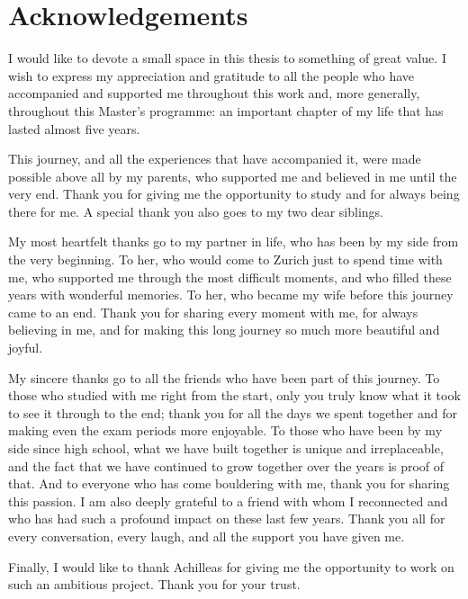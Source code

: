\chapter*{Acknowledgements}

I would like to devote a small space in this thesis to something of great value. I wish to express my appreciation and gratitude to all the people who have accompanied and supported me throughout this work and, more generally, throughout this Master's programme: an important chapter of my life that has lasted almost five years.

This journey, and all the experiences that have accompanied it, were made possible above all by my parents, who supported me and believed in me until the very end. Thank you for giving me the opportunity to study and for always being there for me. A special thank you also goes to my two dear siblings.

My most heartfelt thanks go to my partner in life, who has been by my side from the very beginning. To her, who would come to Zurich just to spend time with me, who supported me through the most difficult moments, and who filled these years with wonderful memories. To her, who became my wife before this journey came to an end. Thank you for sharing every moment with me, for always believing in me, and for making this long journey so much more beautiful and joyful.

My sincere thanks go to all the friends who have been part of this journey. To those who studied with me right from the start, only you truly know what it took to see it through to the end; thank you for all the days we spent together and for making even the exam periods more enjoyable. To those who have been by my side since high school, what we have built together is unique and irreplaceable, and the fact that we have continued to grow together over the years is proof of that. And to everyone who has come bouldering with me, thank you for sharing this passion. I am also deeply grateful to a friend with whom I reconnected and who has had such a profound impact on these last few years. Thank you all for every conversation, every laugh, and all the support you have given me.


Finally, I would like to thank Achilleas for giving me the opportunity to work on such an ambitious project. Thank you for your trust.


\clearpage
